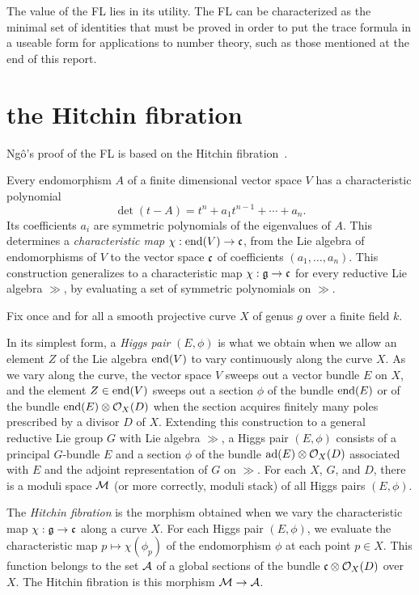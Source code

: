 The value of the FL lies in its utility.  The FL can be characterized
as the minimal set of identities that must be proved in order to put
the trace formula in a useable form for applications to number theory, such as those
mentioned at the end of this report.

\section{the Hitchin fibration}

Ng\^o's proof of the FL is based on the Hitchin fibration~\cite{Hitchin:87}.

Every endomorphism $A$
of a finite dimensional vector space $V$ has a characteristic polynomial
\begin{equation}
\det(t - A) = t^n + a_1 t^{n-1} + \cdots +a_n.
\end{equation}
Its coefficients $a_i$ are symmetric polynomials of the eigenvalues of
$A$.  This determines a {\it characteristic map} $\chi:\op{end}(V) \to
\cc$, from the Lie algebra of endomorphisms of $V$ to the vector space
$\cc$ of coefficients $(a_1,\ldots,a_n)$.  This construction
generalizes to a characteristic map $\chi:\gg\to \cc$ for every
reductive Lie algebra $\gg$, by evaluating a set of symmetric
polynomials on $\gg$.

Fix once and for all a smooth projective
curve $X$ of genus $g$ over a finite field $k$.  

In its simplest form, a {\it Higgs pair} $(E,\phi)$
is what we obtain when we allow an element $Z$ of the Lie
algebra $\op{end}(V)$ to vary continuously along the curve $X$.  
As we vary along the curve, the vector space $V$ sweeps out a vector
bundle $E$ on $X$, and the element $Z\in\op{end}(V)$ sweeps out a
section $\phi$ of the bundle $\op{end}(E)$ or of the bundle
$\op{end}(E)\otimes {\OO}_X(D)$ when the section acquires finitely
many poles prescribed by a divisor $D$ of $X$.  Extending this
construction to a general reductive Lie group $G$ with Lie algebra
$\gg$, a Higgs pair $(E,\phi)$ consists of a principal $G$-bundle $E$
and a section $\phi$ of the bundle $\op{ad}(E)\otimes {\OO}_X(D)$
associated with $E$ and the adjoint representation of $G$ on $\gg$.
For each $X$, $G$, and $D$, there is a moduli space ${\MM}$ (or more
correctly, moduli stack) of all Higgs pairs $(E,\phi)$.

The {\it Hitchin fibration} is the morphism obtained when we vary the
characteristic map $\chi:\gg\to \cc$  along a
curve $X$.  For each Higgs pair $(E,\phi)$, we evaluate the
characteristic map $p\mapsto \chi(\phi_p)$ of the endomorphism $\phi$
at each point $p\in X$. This function belongs to the set $\AA$ of a
global sections of the bundle $\cc\otimes {\OO}_X(D)$ over $X$.  The
Hitchin fibration is this morphism ${\MM}\to {\AA}$.

